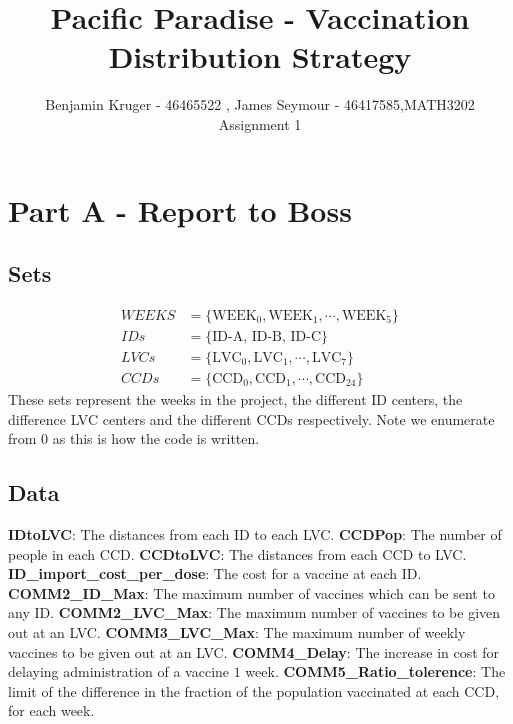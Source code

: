 \documentclass[12pt]{article}
\title{Pacific Paradise - Vaccination Distribution Strategy}
\author{Benjamin Kruger - 46465522 , James Seymour - 46417585,MATH3202 Assignment 1}
\begin{document}
    \maketitle
    \section{Part A - Report to Boss}
    \subsection{Sets}\label{1.1}
        \begin{align*}
            WEEKS &= \{\text{WEEK}_0, \text{WEEK}_1, \cdots, \text{WEEK}_5\}\\
            IDs &= \{\text{ID-A, ID-B, ID-C}\}\\
            LVCs &= \{\text{LVC}_0, \text{LVC}_1, \cdots, \text{LVC}_7\}\\
            CCDs &= \{\text{CCD}_0, \text{CCD}_1, \cdots, \text{CCD}_24\}
        \end{align*}
        These sets represent the weeks in the project, the different ID centers, the difference LVC centers and the different CCDs respectively. Note we enumerate from \(0\) as this is how the code is written.
    \subsection{Data}
        \noindent \textbf{IDtoLVC}: The distances from each ID to each LVC.
        \vskip 0.1cm
        \noindent\textbf{CCDPop}: The number of people in each CCD.
        \vskip 0.1cm
        \noindent\textbf{CCDtoLVC}: The distances from each CCD to LVC.
        \vskip 0.1cm
        \noindent\textbf{ID\_import\_cost\_per\_dose}: The cost for a vaccine at each ID.
        \vskip 0.1cm
        \noindent\textbf{COMM2\_ID\_Max}: The maximum number of vaccines which can be sent to any ID.
        \vskip 0.1cm
        \noindent\textbf{COMM2\_LVC\_Max}: The maximum number of vaccines to be given out at an LVC.
        \vskip 0.1cm
        \noindent\textbf{COMM3\_LVC\_Max}: The maximum number of weekly vaccines to be given out at an LVC.
        \vskip 0.1cm
	\noindent\textbf{COMM4\_Delay}: The increase in cost for delaying administration of a vaccine \(1\) week.
        \vskip 0.1cm
        \noindent\textbf{COMM5\_Ratio\_tolerence}: The limit of the difference in the fraction of the population vaccinated at each CCD, for each week.\\
\end{document}
